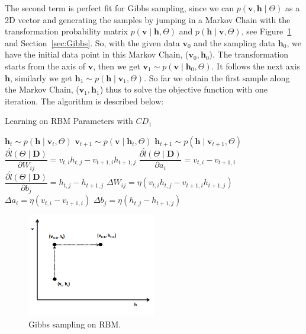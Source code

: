 \documentclass[11pt,twoside,a4paper]{article}
\begin{document}
	The second term is perfect fit for Gibbs sampling, since we can $ p(\mathbf{v}, \mathbf{h} \mid \Theta) $ as a 2D vector and generating the samples by jumping in a Markov Chain with the transformation probability matrix $ p(\mathbf{v} \mid \mathbf{h}, \Theta) $ and $ p(\mathbf{h} \mid \mathbf{v}, \Theta) $, see Figure~\ref{fig:gibbs} and Section~\ref{sec:Gibbs}.
	So, with the given data $ \mathbf{v}_0 $ and the sampling data $ \mathbf{h}_0 $, we have the initial data point in this Markov Chain,  ($ \mathbf{v}_0, \mathbf{h}_0$).
	The transformation starts from the axis of $ \mathbf{v} $, then we get $ \mathbf{v}_1 \sim p( \mathbf{v} \mid \mathbf{h}_0, \Theta) $.
	It follows the next axis $ \mathbf{h} $, similarly we get $ \mathbf{h}_1 \sim p( \mathbf{h} \mid \mathbf{v}_1, \Theta) $.
	So far we obtain the first sample along the Markov Chain, ($ \mathbf{v}_1, \mathbf{h}_1$) thus to solve the objective function with one iteration.
	The algorithm is described below:   
	\begin{algorithm}[h]
		\caption{Learning on RBM Parameters with $ CD_1 $}
		\label{alg:learn}
		\begin{algorithmic}
			 
			\State $ \mathbf{h}_t \sim p( \mathbf{h} \mid \mathbf{v}_t, \Theta) $
			\State $ \mathbf{v}_{t+1} \sim p( \mathbf{v} \mid \mathbf{h}_{t}, \Theta) $
			\State $ \mathbf{h}_{t+1} \sim p( \mathbf{h} \mid \mathbf{v}_{t+1}, \Theta) $
			\State $ \dfrac{\partial \hat{l} (\Theta \mid \mathbf{D})}{\partial W_{ij}} = v_{t,i} h_{t,j} - v_{t+1,i} h_{t+1,j}$
			\State $ \dfrac{\partial \hat{l} (\Theta \mid \mathbf{D})}{\partial a_{i}} = v_{t,i} - v_{t+1,i} $
			\State $  \dfrac{\partial \hat{l} (\Theta \mid \mathbf{D})}{\partial b_{j}} = h_{t,j} - h_{t+1,j}$
			\State $ \Delta W_{ij} = \eta ( v_{t,i} h_{t,j} - v_{t+1,i} h_{t+1,j}) $
			\State $ \Delta a_{i} = \eta ( v_{t,i} - v_{t+1,i}) $
			\State $ \Delta b_{j} = \eta ( h_{t,j} - h_{t+1,j}) $
			\EndFor
		\end{algorithmic}
	\end{algorithm}
	\begin{figure}[hbt]
		\centering
		\includegraphics[width=0.5\textwidth]{img/gibbs.png}
		\caption{Gibbs sampling on RBM.}
		\label{fig:gibbs}
	\end{figure}	
\end{document}
